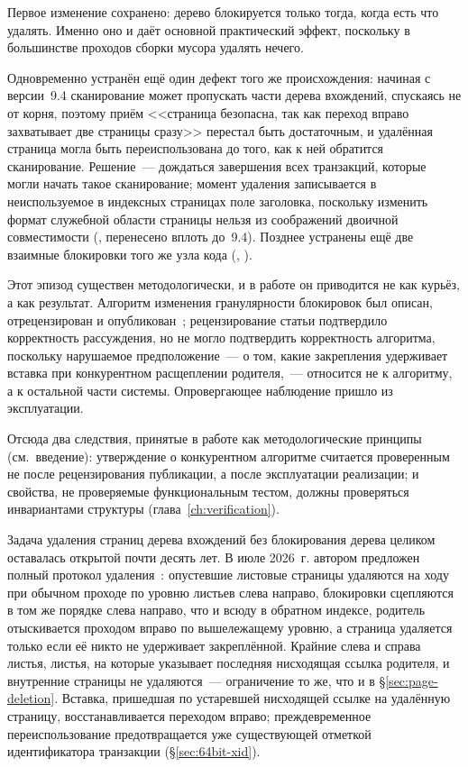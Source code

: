 Первое изменение сохранено: дерево блокируется только тогда, когда есть что
удалять. Именно оно и даёт основной практический эффект, поскольку в
большинстве проходов сборки мусора удалять нечего.

Одновременно устранён ещё один дефект того же происхождения: начиная с
версии~9.4 сканирование может пропускать части дерева вхождений, спускаясь
не от корня, поэтому приём <<страница безопасна, так как переход вправо
захватывает две страницы сразу>> перестал быть достаточным, и удалённая
страница могла быть переиспользована до того, как к ней обратится
сканирование. Решение~--- дождаться завершения всех транзакций, которые могли
начать такое сканирование; момент удаления записывается в неиспользуемое в
индексных страницах поле заголовка, поскольку изменить формат служебной
области страницы нельзя из соображений двоичной совместимости
(, перенесено вплоть до~9.4). Позднее устранены ещё две взаимные
блокировки того же узла кода (, ).

Этот эпизод существен методологически, и в работе он приводится не как
курьёз, а как результат. Алгоритм изменения гранулярности блокировок был
описан, отрецензирован и опубликован~\cite{borodin2018gin}; рецензирование
статьи подтвердило корректность рассуждения, но не могло подтвердить
корректность алгоритма, поскольку нарушаемое предположение~--- о том, какие
закрепления удерживает вставка при конкурентном расщеплении родителя,~---
относится не к алгоритму, а к остальной части системы. Опровергающее
наблюдение пришло из эксплуатации.

Отсюда два следствия, принятые в работе как методологические принципы
(см.~введение): утверждение о конкурентном алгоритме считается проверенным не
после рецензирования публикации, а после эксплуатации реализации; и свойства,
не проверяемые функциональным тестом, должны проверяться инвариантами
структуры (глава~\ref{ch:verification}).

Задача удаления страниц дерева вхождений без блокирования дерева целиком
оставалась открытой почти десять лет. В июле 2026~г. автором предложен полный
протокол удаления~\cite{thread-gin-posting-delete}: опустевшие листовые
страницы удаляются на ходу при обычном проходе по уровню листьев слева направо,
блокировки сцепляются в том же порядке слева направо, что и всюду в обратном
индексе, родитель отыскивается проходом вправо по вышележащему уровню, а
страница удаляется только если её никто не удерживает закреплённой. Крайние
слева и справа листья, листья, на которые указывает последняя нисходящая ссылка
родителя, и внутренние страницы не удаляются~--- ограничение то же, что и в
§\ref{sec:page-deletion}. Вставка, пришедшая по устаревшей нисходящей ссылке на
удалённую страницу, восстанавливается переходом вправо; преждевременное
переиспользование предотвращается уже существующей отметкой идентификатора
транзакции (§\ref{sec:64bit-xid}).

